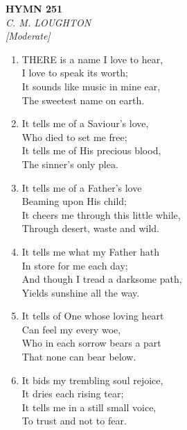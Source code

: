 \newpage
\begin{center}
    {\Large \textbf{HYMN 251}}
    \\
    \textit{C. M. LOUGHTON}
    \\
    \textit{\small [Moderate]}
\end{center}
\vspace{1em}

\begin{enumerate}
    \item THERE is a name I love to hear, \\
            I love to speak its worth; \\
        It sounds like music in mine ear, \\
            The sweetest name on earth.

    \item It tells me of a Saviour's love, \\
            Who died to set me free; \\
        It tells me of His precious blood, \\
            The sinner's only plea.

    \item It tells me of a Father's love \\
            Beaming upon His child; \\
        It cheers me through this little while, \\
            Through desert, waste and wild.

    \item It tells me what my Father hath \\
            In store for me each day; \\
        And though I tread a darksome path, \\
            Yields sunshine all the way.

    \item It tells of One whose loving heart \\
            Can feel my every woe, \\
        Who in each sorrow bears a part \\
            That none can bear below.

    \item It bids my trembling soul rejoice, \\
            It dries each rising tear; \\
        It tells me in a still small voice, \\
            To trust and not to fear.


\end{enumerate}

